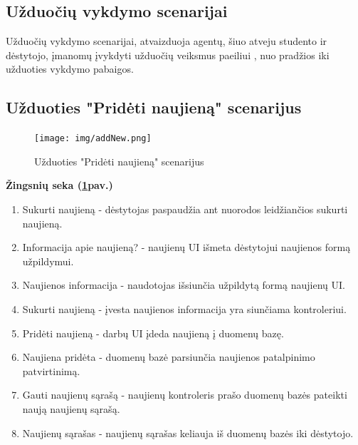 \documentclass{VUMIFPSkursinis}
\begin{document}
\subsection{Užduočių vykdymo scenarijai}
Užduočių vykdymo scenarijai, atvaizduoja agentų, šiuo atveju studento ir dėstytojo, įmanomų įvykdyti užduočių veiksmus paeiliui , nuo pradžios iki užduoties vykdymo pabaigos.
\subsection{Užduoties "Pridėti naujieną" scenarijus}
\begin{figure}[H]
	\centering
	\texttt{[image: img/addNew.png]}
	\caption{Užduoties "Pridėti naujieną" scenarijus}
	\label{fig:addNew}
\end{figure}
\textbf{Žingsnių seka (\ref{fig:addNew}pav.)}\\
\begin{enumerate}
	\item Sukurti naujieną - dėstytojas paspaudžia ant nuorodos leidžiančios sukurti naujieną.
	\item Informacija apie naujieną? - naujienų UI išmeta dėstytojui naujienos formą užpildymui.
	\item Naujienos informacija - naudotojas išsiunčia užpildytą formą naujienų UI.
	\item Sukurti naujieną - įvesta naujienos informacija yra siunčiama kontroleriui.
	\item Pridėti naujieną - darbų UI įdeda naujieną į duomenų bazę.
	\item Naujiena pridėta - duomenų bazė parsiunčia naujienos patalpinimo patvirtinimą.
	\item Gauti naujienų sąrašą - naujienų kontroleris prašo duomenų bazės pateikti naują naujienų sąrašą.
	\item Naujienų sąrašas - naujienų sąrašas keliauja iš duomenų bazės iki dėstytojo.
\end{enumerate}
\end{document}
